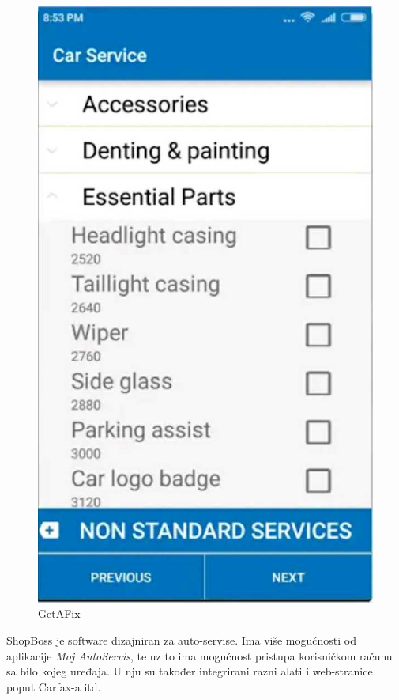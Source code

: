 		\begin{figure}[H]
			\includegraphics[scale=0.2]{slike/getafix.JPG}
			\centering
			\caption{GetAFix}
			\label{fig:getafix}
		\end{figure}  
		
		ShopBoss je software dizajniran za auto-servise. Ima više mogućnosti od aplikacije \textit{Moj AutoServis}, te uz to ima mogućnost pristupa korisničkom računu sa bilo kojeg uređaja. U nju su također integrirani razni alati i web-stranice poput Carfax-a itd.
		
